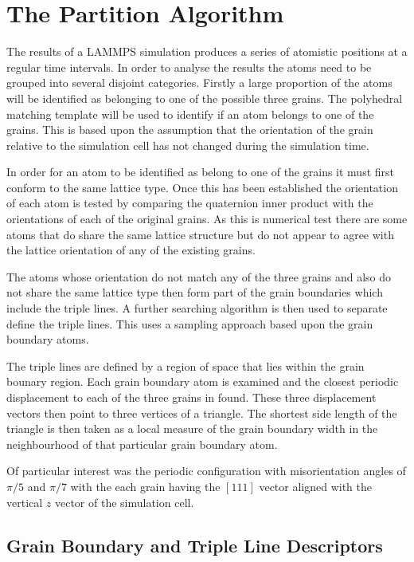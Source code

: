 \documentclass[12pt,a4paper]{book}
\begin{document}
\section{The Partition Algorithm}
The results of a LAMMPS simulation produces a series of atomistic positions at a regular time intervals. In order to analyse the results the atoms need to be grouped into several disjoint categories. Firstly a large proportion of the atoms will be identified as belonging to one of the possible three grains. The polyhedral matching template will be used to identify if an atom belongs to one of the grains. This is based upon the assumption that the orientation of the grain relative to the simulation cell has not changed during the simulation time. 

In order for an atom to be identified as belong to one of the grains it must first conform to the same lattice type. Once this has been established the orientation of each atom is tested by comparing the quaternion inner product with the orientations of each of the original grains. As this is numerical test there are some atoms that do share the same lattice structure but do not appear to agree with the lattice orientation of any of the existing grains. 

The atoms whose orientation do not match any of the three grains and also do not share the same lattice type then form part of the grain boundaries which include the triple lines. A further searching algorithm is then used to separate define the triple lines. This uses a sampling approach based upon the grain boundary atoms. 

The triple lines are defined by a region of space that lies within the grain bounary region. Each grain boundary atom is examined and the closest periodic displacement to each of the three grains in found. These three displacement vectors then point to three vertices of a triangle. The shortest side length of the triangle is then taken as a local measure of the grain boundary width in the neighbourhood of that particular grain boundary atom.  

Of particular interest was the periodic configuration with misorientation angles of $\pi/5$ and $\pi/7$ with the each grain having the $[1 1 1]$ vector aligned with the vertical $z$ vector of the simulation cell.

\subsection{Grain Boundary and Triple Line Descriptors}
\end{document}
